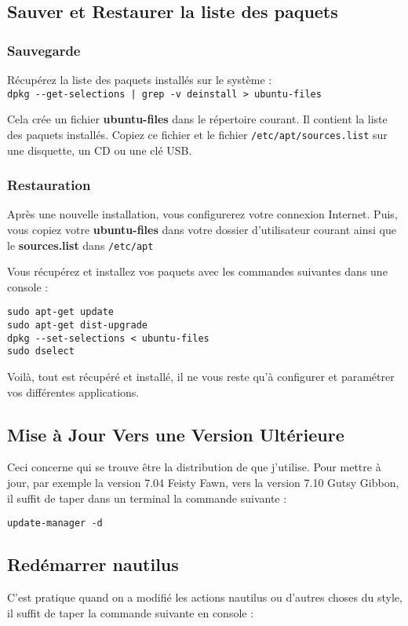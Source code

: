 \documentclass[a4paper,twoside]{article}
\begin{document}
\subsection{Sauver et Restaurer la liste des paquets}
\subsubsection{Sauvegarde}

Récupérez la liste des paquets installés sur le système :\\
\verb#dpkg --get-selections | grep -v deinstall > ubuntu-files#

Cela crée un fichier \textbf{ubuntu-files} dans le répertoire courant. Il contient la liste des paquets installés. Copiez ce fichier et le fichier \verb|/etc/apt/sources.list| sur une disquette, un CD ou une clé USB.
\subsubsection{Restauration}

Après une nouvelle installation, vous configurerez votre connexion Internet. Puis, vous copiez votre \textbf{ubuntu-files} dans votre dossier d'utilisateur courant ainsi que le \textbf{sources.list} dans \verb|/etc/apt|

Vous récupérez et installez vos paquets avec les commandes suivantes dans une console :

\begin{verbatim}
sudo apt-get update
sudo apt-get dist-upgrade
dpkg --set-selections < ubuntu-files
sudo dselect
\end{verbatim}

Voilà, tout est récupéré et installé, il ne vous reste qu'à configurer et paramétrer vos différentes applications.

\subsection{Mise à Jour Vers une Version Ultérieure}
Ceci concerne  qui se trouve être la distribution de  que j'utilise. Pour mettre à jour, par exemple la version 7.04 Feisty Fawn, vers la version 7.10 Gutsy Gibbon, il suffit de taper dans un terminal la commande suivante :

\verb|update-manager -d|

\subsection{Redémarrer nautilus}
C'est pratique quand on a modifié les actions nautilus ou d'autres choses du style, il suffit de taper la commande suivante en console :
\end{document}
